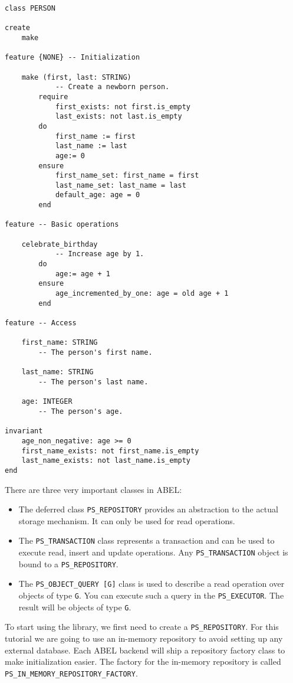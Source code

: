 \documentclass[a4paper,12pt]{report}
\begin{document}
\begin{lstlisting}[language=OOSC2Eiffel, captionpos=b, caption={The PERSON class}, label={lst:person_class}]
class PERSON

create
	make

feature {NONE} -- Initialization

	make (first, last: STRING)
			-- Create a newborn person.
		require
			first_exists: not first.is_empty
			last_exists: not last.is_empty
		do
			first_name := first
			last_name := last
			age:= 0
		ensure
			first_name_set: first_name = first
			last_name_set: last_name = last
			default_age: age = 0
		end

feature -- Basic operations

	celebrate_birthday
			-- Increase age by 1.
		do
			age:= age + 1
		ensure
			age_incremented_by_one: age = old age + 1
		end

feature -- Access

	first_name: STRING
		-- The person's first name.

	last_name: STRING
		-- The person's last name.

	age: INTEGER
		-- The person's age.

invariant
	age_non_negative: age >= 0
	first_name_exists: not first_name.is_empty
	last_name_exists: not last_name.is_empty
end

\end{lstlisting}

There are three very important classes in ABEL:
\begin{itemize}
 \item The deferred class \lstinline!PS_REPOSITORY! provides an abstraction to the actual storage mechanism. It can only be used for read operations.
 \item The \lstinline!PS_TRANSACTION! class represents a transaction and can be used to execute read, insert and update operations. Any \lstinline!PS_TRANSACTION! object is bound to a \lstinline!PS_REPOSITORY!.

 \item The \lstinline!PS_OBJECT_QUERY [G]! class is used to describe a read operation over objects of type \lstinline!G!. You can execute such a query in the \lstinline!PS_EXECUTOR!. 
	The result will be objects of type \lstinline!G!.

 
\end{itemize}
To start using the library, we first need to create a \lstinline!PS_REPOSITORY!.
For this tutorial we are going to use an in-memory repository to avoid setting up any external database.
Each ABEL backend will ship a repository factory class to make initialization easier.
The factory for the in-memory repository is called \lstinline!PS_IN_MEMORY_REPOSITORY_FACTORY!.
\end{document}

